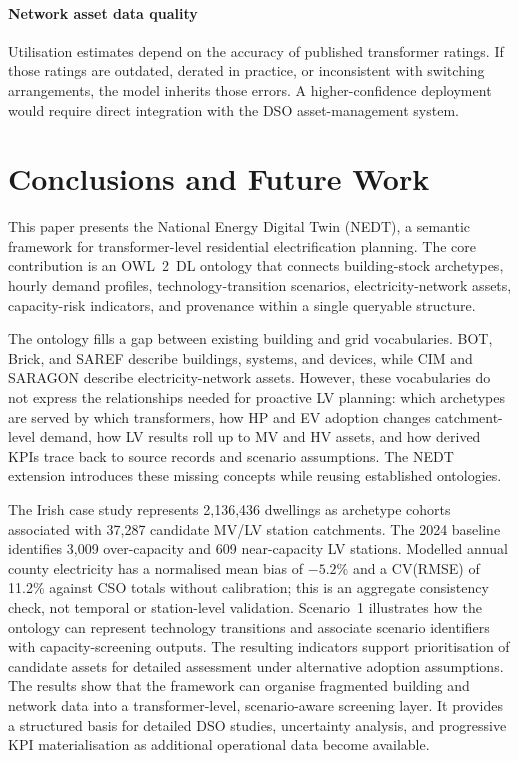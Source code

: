 \documentclass[preprint,12pt]{elsarticle}
\begin{document}
\paragraph{Network asset data quality}
Utilisation estimates depend on the accuracy of published transformer
ratings.
If those ratings are outdated, derated in practice, or inconsistent with
switching arrangements, the model inherits those errors.
A higher-confidence deployment would require direct integration with the
DSO asset-management system.


\section{Conclusions and Future Work}
\label{sec:conclusions}

This paper presents the National Energy Digital Twin (NEDT), a semantic
framework for transformer-level residential electrification planning.
The core contribution is an OWL~2~DL ontology that connects building-stock
archetypes, hourly demand profiles, technology-transition scenarios,
electricity-network assets, capacity-risk indicators, and provenance within
a single queryable structure.

The ontology fills a gap between existing building and grid vocabularies.
BOT, Brick, and SAREF describe buildings, systems, and devices, while CIM
and SARAGON describe electricity-network assets.
However, these vocabularies do not express the relationships needed for
proactive LV planning: which archetypes are served by which transformers,
how HP and EV adoption changes catchment-level demand, how LV results roll
up to MV and HV assets, and how derived KPIs trace back to source records
and scenario assumptions.
The NEDT extension introduces these missing concepts while reusing
established ontologies.

The Irish case study represents 2,136,436 dwellings as archetype cohorts
associated with 37,287 candidate MV/LV station catchments.
The 2024 baseline identifies 3,009 over-capacity and 609 near-capacity LV
stations. Modelled annual county electricity has a normalised mean bias of
$-5.2\%$ and a CV(RMSE) of 11.2\% against CSO totals without calibration;
this is an aggregate consistency check, not temporal or station-level
validation.
Scenario~1 illustrates how the ontology can represent technology transitions
and associate scenario identifiers with capacity-screening outputs. The
resulting indicators support prioritisation of candidate assets for detailed
assessment under alternative adoption assumptions.
The results show that the framework can organise fragmented building and
network data into a transformer-level, scenario-aware screening layer. It
provides a structured basis for detailed DSO studies, uncertainty analysis,
and progressive KPI materialisation as additional operational data become
available.
\end{document}
